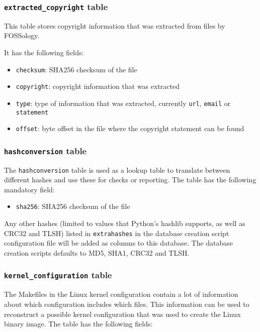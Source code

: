 \documentclass[10pt,a4paper]{article}
\begin{document}
\subsubsection{\texttt{extracted\_copyright} table}
This table stores copyright information that was extracted from files by
FOSSology.

It has the following fields:

\begin{itemize}
\item \texttt{checksum}: SHA256 checksum of the file
\item \texttt{copyright}: copyright information that was extracted
\item \texttt{type}: type of information that was extracted, currently
\texttt{url}, \texttt{email} or \texttt{statement}
\item \texttt{offset}: byte offset in the file where the copyright statement
can be found
\end{itemize}

\subsubsection{\texttt{hashconversion} table}

The \texttt{hashconversion} table is used as a lookup table to translate
between different hashes and use these for checks or reporting. The
table has the following mandatory field:

\begin{itemize}
\item \texttt{sha256}: SHA256 checksum of the file
\end{itemize}

Any other hashes (limited to values that Python's hashlib supports, as well as
CRC32 and TLSH) listed in \texttt{extrahashes} in the database creation script
configuration file will be added as columns to this database. The database
creation scripts defaults to MD5, SHA1, CRC32 and TLSH.

\subsubsection{\texttt{kernel\_configuration} table}

The Makefiles in the Linux kernel configuration contain a lot of information
about which configuration includes which files. This information can be used to
reconstruct a possible kernel configuration that was used to create the Linux
binary image. The table has the following fields:
\end{document}

